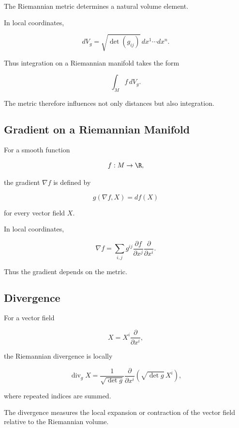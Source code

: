 The Riemannian metric determines a natural volume element.

In local coordinates,

\[
\boxed{
dV_g
=
\sqrt{\det(g_{ij})}\,
dx^1\cdots dx^n.
}
\]

Thus integration on a Riemannian manifold takes the form

\[
\boxed{
\int_M f\,dV_g.
}
\]

The metric therefore influences not only distances but also integration.

\subsection{Gradient on a Riemannian Manifold}
\label{subsec:riemannian-gradient}

For a smooth function

\[
f:M\to\R,
\]

the gradient \(\nabla f\) is defined by

\[
\boxed{
g(\nabla f,X)
=
df(X)
}
\]

for every vector field \(X\).

In local coordinates,

\[
\boxed{
\nabla f
=
\sum_{i,j}
g^{ij}
\frac{\partial f}{\partial x^j}
\frac{\partial}{\partial x^i}.
}
\]

Thus the gradient depends on the metric.

\subsection{Divergence}
\label{subsec:riemannian-divergence}

For a vector field

\[
X
=
X^i
\frac{\partial}{\partial x^i},
\]

the Riemannian divergence is locally

\[
\boxed{
\operatorname{div}_g X
=
\frac{1}{\sqrt{\det g}}
\frac{\partial}{\partial x^i}
\left(
\sqrt{\det g}\,X^i
\right),
}
\]

where repeated indices are summed.

The divergence measures the local expansion or contraction of the vector
field relative to the Riemannian volume.

